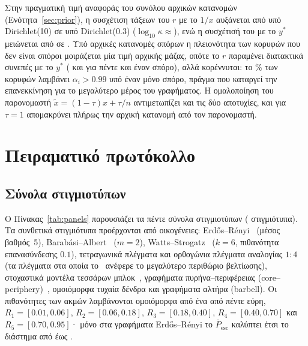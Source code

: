 \documentclass[11pt,a4paper]{article}
\theoremstyle{definition}
\theoremstyle{plain}
\newcommand{\Pescbar}{\bar{P}_{\mathrm{esc}}}
\begin{document}
Στην πραγματική τιμή αναφοράς του συνόλου αρχικών κατανομών (Ενότητα~\ref{sec:prior}), η συσχέτιση τάξεων του $r$ με το $1/x$ αυξάνεται από \RinvDirTen{} υπό Dirichlet(10) σε \RinvDirSmall{} υπό Dirichlet(0.3) ($\log_{10}\kappa\approx{}$\KappaDirSmall{}), ενώ η συσχέτισή του με το $y^*$ μειώνεται από \RyDirTen{} σε \RyDirSmall. Υπό αρχικές κατανομές σπόρων η πλειονότητα των κορυφών που δεν είναι σπόροι μοιράζεται μία τιμή αρχικής μάζας, οπότε το $r$ παραμένει διατακτικά συνεπές με το $y^*$ (\RySeedFive{} και \RySeedOne{} για πέντε και έναν σπόρο), αλλά κορέννυται: το \SatSeedOne\% των κορυφών λαμβάνει $\alpha_i>0.99$ υπό έναν μόνο σπόρο, πράγμα που καταργεί την επανεκκίνηση για το μεγαλύτερο μέρος του γραφήματος. Η ομαλοποίηση του παρονομαστή $\tilde x=(1-\tau)x+\tau/n$ αντιμετωπίζει και τις δύο αποτυχίες, και για $\tau=1$ απομακρύνει πλήρως την αρχική κατανομή από τον παρονομαστή.

\FloatBarrier
\section{Πειραματικό πρωτόκολλο}\label{sec:protocol}

\subsection{Σύνολα στιγμιοτύπων}\label{sec:panels}

Ο Πίνακας~\ref{tab:panels} παρουσιάζει τα πέντε σύνολα στιγμιοτύπων (\NTotal{} στιγμιότυπα). Τα συνθετικά στιγμιότυπα προέρχονται από \NFamilies{} οικογένειες: Erdős--Rényi~\cite{erdos59} (μέσος βαθμός~5), Barabási--Albert~\cite{barabasi99} ($m=2$), Watts--Strogatz~\cite{watts98} ($k=6$, πιθανότητα επανασύνδεσης $0.1$), τετραγωνικά πλέγματα και ορθογώνια πλέγματα αναλογίας $1{:}4$ (τα πλέγματα στα οποία το~\cite{konstantellos26} ανέφερε το μεγαλύτερο περιθώριο βελτίωσης), στοχαστικά μοντέλα τεσσάρων μπλοκ~\cite{holland83}, γραφήματα πυρήνα--περιφέρειας (core--periphery)~\cite{borgatti00}, ομοιόμορφα τυχαία δένδρα και γραφήματα αλτήρα (barbell). Οι πιθανότητες των ακμών λαμβάνονται ομοιόμορφα από ένα από πέντε εύρη, $R_1=[0.01,0.06]$, $R_2=[0.06,0.18]$, $R_3=[0.18,0.40]$, $R_4=[0.40,0.70]$ και $R_5=[0.70,0.95]$· μόνο στα γραφήματα Erdős--Rényi το $\Pescbar$ καλύπτει έτσι το διάστημα από \ERPbarMin{} έως \ERPbarMax.
\end{document}
